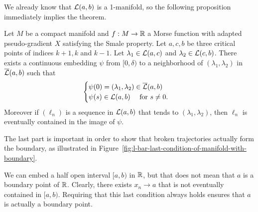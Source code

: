 We already know that $\mathcal L(a, b)$ is a 1-manifold, so the following proposition immediately implies the theorem.

\begin{prop}
    Let $M$ be a compact manifold and $f: M \to  \mathbb{R}$ a Morse function with adapted pseudo-gradient $X$ satisfying the Smale property. Let  $a,c,b$ be three critical points of indices  $k+1, k$ and $k-1$. Let $\lambda_1 \in \mathcal L(a, c)$ and $\lambda_2 \in \mathcal L(c, b)$.
    There exists a continuous embedding $\psi$ from $[0, \delta)$ to a neighborhood of $(\lambda_1, \lambda_2)$ in $\overline{\mathcal L}(a, b)$ such that
    \[
    \begin{cases}
        \psi(0) = (\lambda_1, \lambda_2) \in \overline{\mathcal L}(a, b)\\
        \psi(s) \in \mathcal L(a, b) \quad \text{ for } s \neq 0.
    \end{cases}
    \] 
    Moreover if $(\ell_n)$ is a sequence in $\mathcal L(a, b)$ that tends to $(\lambda_1, \lambda_2)$, then $ \ell_n$ is eventually contained in the image of $\psi$.
\end{prop}

The last part is important in order to show that broken trajectories actually form the boundary, as illustrated in Figure~\ref{fig:l-bar-last-condition-of-manifold-with-boundary}.
\begin{marginfigure}
    \centering
    \caption{We can embed a half open interval $[a, b)$ in $\mathbb{R}$, but that does not mean that $a$ is a boundary point of $\mathbb{R}$. Clearly, there exists $x_n \to a$ that is not eventually contained in $[a,b)$.
        Requiring that this last condition always holds ensures that $a$ is actually a boundary point.
    }
    \label{fig:l-bar-last-condition-of-manifold-with-boundary}
\end{marginfigure}

